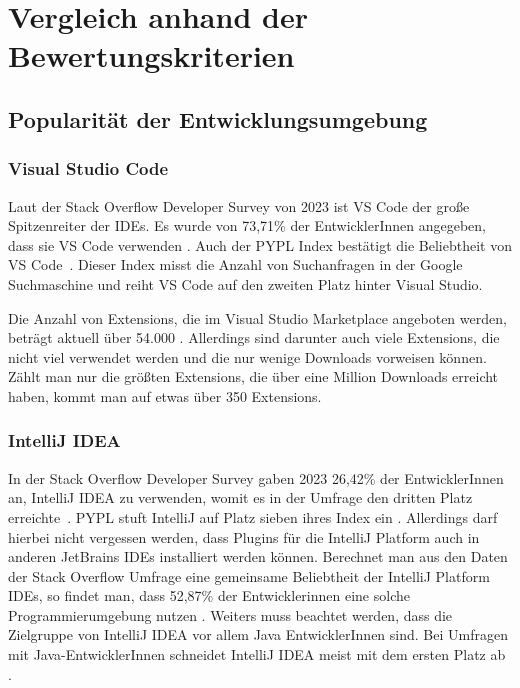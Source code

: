 \chapter{Vergleich anhand der Bewertungskriterien}
\label{cha:Vergleich}

\section{Popularität der Entwicklungsumgebung}
\label{sec:Vergleich_Popularität}

\subsection{Visual Studio Code}

Laut der Stack Overflow Developer Survey von 2023 ist
VS Code der große Spitzenreiter der IDEs. Es wurde von
73,71\% der EntwicklerInnen angegeben,
dass sie VS Code verwenden \cite{StackOverflowSurvey2023}.
Auch der PYPL Index bestätigt die Beliebtheit von VS Code~\cite{PYPL}.
Dieser Index misst die Anzahl von Suchanfragen in der Google Suchmaschine
und reiht VS Code auf den zweiten Platz hinter Visual Studio.

Die Anzahl von Extensions, die im Visual Studio Marketplace angeboten werden,
beträgt aktuell über 54.000 \cite{VSCodeMarketplace}. Allerdings sind 
darunter auch viele Extensions, die nicht viel verwendet werden und die nur
wenige Downloads vorweisen können. Zählt man nur die größten 
Extensions, die über eine Million Downloads erreicht haben,
kommt man auf etwas über 350 Extensions.

\subsection{IntelliJ IDEA}

In der Stack Overflow Developer Survey gaben 2023
26,42\% der EntwicklerInnen an, IntelliJ IDEA zu verwenden,
womit es in der Umfrage den dritten Platz erreichte~\cite{StackOverflowSurvey2023}.
PYPL stuft IntelliJ auf Platz sieben ihres Index ein \cite{PYPL}.
Allerdings darf hierbei nicht vergessen werden, dass Plugins
für die IntelliJ Platform auch in anderen JetBrains IDEs installiert
werden können. Berechnet man aus den Daten der Stack Overflow Umfrage
eine gemeinsame Beliebtheit der IntelliJ Platform IDEs, so findet man,
dass 52,87\% der Entwicklerinnen eine solche Programmierumgebung nutzen \cite{StackOverflowSurvey}.
Weiters muss beachtet werden, dass die Zielgruppe von IntelliJ IDEA
vor allem Java EntwicklerInnen sind. Bei Umfragen mit Java-EntwicklerInnen 
schneidet IntelliJ IDEA meist mit dem ersten Platz ab \cite{JRebelIDEs,JRebelDeveloperProductivityReport,BetterprojectsfasterPouplarityIndex}.

